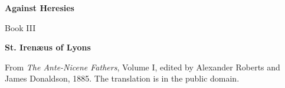 \documentclass[11pt,letterpaper]{article}
\begin{document}
\color{ink}

\begin{titlepage}
\centering
\vspace*{4em}
{\LARGE\bfseries\color{heading} Against Heresies\par}
\vspace{1em}
{\large Book III\par}
\vspace{2em}
{\LARGE\bfseries\color{heading} St. Irenæus of Lyons\par}
\vfill
{\small From \emph{The Ante-Nicene Fathers}, Volume I, edited by
Alexander Roberts and James Donaldson, 1885. The translation is in the
public domain.\par}
\vspace{2em}
\end{titlepage}

\tableofcontents
\clearpage


\end{document}
